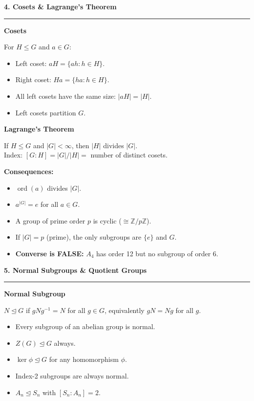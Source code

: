 \documentclass[10pt,twocolumn]{article}
\newcommand{\sect}[1]{\medskip\noindent\textbf{\large #1}\medskip\hrule\smallskip}
\newcommand{\subsect}[1]{\smallskip\noindent\textbf{#1}\par}
\begin{document}
\sect{4. Cosets \& Lagrange's Theorem}

\subsect{Cosets}
For $H\le G$ and $a\in G$:
\begin{itemize}[nosep,leftmargin=*]
\item Left coset: $aH = \{ah : h\in H\}$.
\item Right coset: $Ha = \{ha : h\in H\}$.
\item All left cosets have the same size: $|aH|=|H|$.
\item Left cosets partition $G$.
\end{itemize}

\subsect{Lagrange's Theorem}
If $H\le G$ and $|G|<\infty$, then $|H|$ divides $|G|$.\\
Index: $[G:H]=|G|/|H|=$ number of distinct cosets.

\textbf{Consequences:}
\begin{itemize}[nosep,leftmargin=*]
\item $\operatorname{ord}(a)$ divides $|G|$.
\item $a^{|G|}=e$ for all $a\in G$.
\item A group of prime order $p$ is cyclic ($\cong\mathbb{Z}/p\mathbb{Z}$).
\item If $|G|=p$ (prime), the only subgroups are $\{e\}$ and $G$.
\item \textbf{Converse is FALSE:} $A_4$ has order 12 but no subgroup of order 6.
\end{itemize}

\sect{5. Normal Subgroups \& Quotient Groups}

\subsect{Normal Subgroup}
$N\trianglelefteq G$ if $gNg^{-1}=N$ for all $g\in G$, equivalently $gN=Ng$ for all $g$.
\begin{itemize}[nosep,leftmargin=*]
\item Every subgroup of an abelian group is normal.
\item $Z(G)\trianglelefteq G$ always.
\item $\ker\phi\trianglelefteq G$ for any homomorphism $\phi$.
\item Index-2 subgroups are always normal.
\item $A_n\trianglelefteq S_n$ with $[S_n:A_n]=2$.
\end{itemize}
\end{document}
